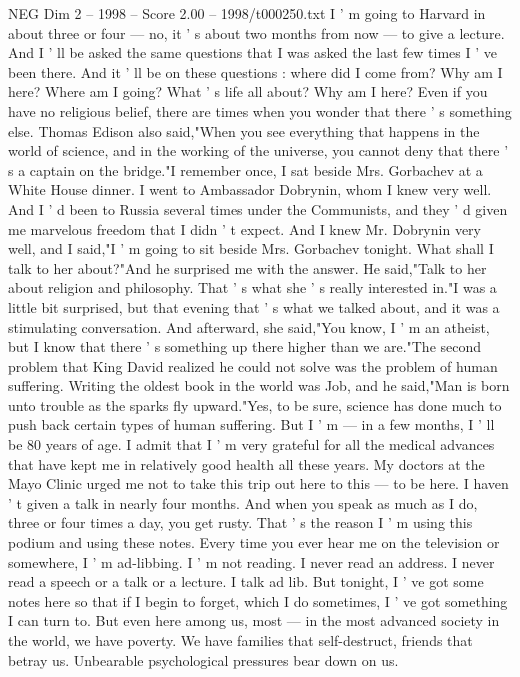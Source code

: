 \begin{textsample}{NEG Dim 2 – 1998 – Score 2.00 – 1998/t000250.txt}
I ' m going to Harvard in about three or four — no, it ' s about two months from now — to give a lecture.
And I ' ll be asked the same questions that I was asked the last few times I ' ve been there.
And it ' ll be on these questions : where did I come from?
Why am I here?
Where am I going?
What ' s life all about?
Why am I here?
Even if you have no religious belief, there are times when you wonder that there ' s something else.
Thomas Edison also said,"When you see everything that happens in the world of science, and in the working of the universe, you cannot deny that there ' s a captain on the bridge."I remember once, I sat beside Mrs.
Gorbachev at a White House dinner.
I went to Ambassador Dobrynin, whom I knew very well.
And I ' d been to Russia several times under the Communists, and they ' d given me marvelous freedom that I didn ' t expect.
And I knew Mr.
Dobrynin very well, and I said,"I ' m going to sit beside Mrs.
Gorbachev tonight.
What shall I talk to her about?"And he surprised me with the answer.
He said,"Talk to her about religion and philosophy.
That ' s what she ' s really interested in."I was a little bit surprised, but that evening that ' s what we talked about, and it was a stimulating conversation.
And afterward, she said,"You know, I ' m an atheist, but I know that there ' s something up there higher than we are."The second problem that King David realized he could not solve was the problem of human suffering.
Writing the oldest book in the world was Job, and he said,"Man is born unto trouble as the sparks fly upward."Yes, to be sure, science has done much to push back certain types of human suffering.
But I ' m — in a few months, I ' ll be 80 years of age.
I admit that I ' m very grateful for all the medical advances that have kept me in relatively good health all these years.
My doctors at the Mayo Clinic urged me not to take this trip out here to this — to be here.
I haven ' t given a talk in nearly four months.
And when you speak as much as I do, three or four times a day, you get rusty.
That ' s the reason I ' m using this podium and using these notes.
Every time you ever hear me on the television or somewhere, I ' m ad-libbing.
I ' m not reading.
I never read an address.
I never read a speech or a talk or a lecture.
I talk ad lib.
But tonight, I ' ve got some notes here so that if I begin to forget, which I do sometimes, I ' ve got something I can turn to.
But even here among us, most — in the most advanced society in the world, we have poverty.
We have families that self-destruct, friends that betray us.
Unbearable psychological pressures bear down on us.

\end{textsample}
